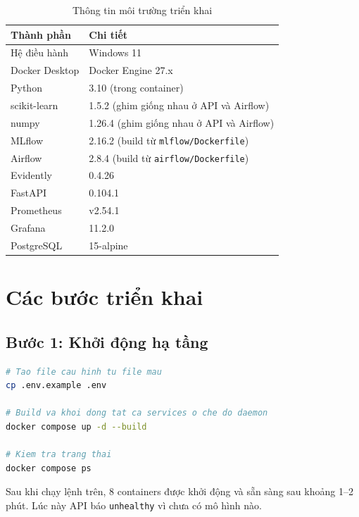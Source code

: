 \documentclass[12pt,a4paper]{report}
\begin{document}
\begin{table}[H]
  \centering
  \caption{Thông tin môi trường triển khai}
  \label{tab:env}
  \begin{tabular}{ll}
    \toprule
    \textbf{Thành phần} & \textbf{Chi tiết} \\
    \midrule
    Hệ điều hành    & Windows 11 \\
    Docker Desktop  & Docker Engine 27.x \\
    Python          & 3.10 (trong container) \\
    scikit-learn    & 1.5.2 (ghim giống nhau ở API và Airflow) \\
    numpy           & 1.26.4 (ghim giống nhau ở API và Airflow) \\
    MLflow          & 2.16.2 (build từ \texttt{mlflow/Dockerfile}) \\
    Airflow         & 2.8.4 (build từ \texttt{airflow/Dockerfile}) \\
    Evidently       & 0.4.26 \\
    FastAPI         & 0.104.1 \\
    Prometheus      & v2.54.1 \\
    Grafana         & 11.2.0 \\
    PostgreSQL      & 15-alpine \\
    \bottomrule
  \end{tabular}
\end{table}

\section{Các bước triển khai}

\subsection{Bước 1: Khởi động hạ tầng}

\begin{lstlisting}[language=bash, caption=Khởi động toàn bộ 8 services bằng Docker Compose]
# Tao file cau hinh tu file mau
cp .env.example .env

# Build va khoi dong tat ca services o che do daemon
docker compose up -d --build

# Kiem tra trang thai
docker compose ps
\end{lstlisting}

Sau khi chạy lệnh trên, 8 containers được khởi động và sẵn sàng sau khoảng 1--2 phút. Lúc này API báo \texttt{unhealthy} vì chưa có mô hình nào.
\end{document}
